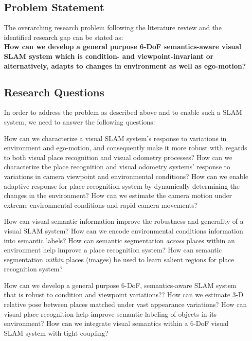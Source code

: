 \documentclass{article}
\begin{document}
\subsection{Problem Statement}

The overarching research problem following the literature review and the identified research gap can be stated as: \\
\textbf{How can we develop a general purpose 6-DoF semantics-aware visual SLAM system which is condition- and viewpoint-invariant or alternatively, adapts to changes in environment as well as ego-motion?}

\subsection{Research Questions}

In order to address the problem as described above and to enable such a SLAM system, we need to answer the following questions:
\begin{outline}
 \1 How can we characterize a visual SLAM system’s response to variations in environment and ego-motion, and consequently make it more robust with regards to both visual place recognition and visual odometry processes?
 \2 How can we characterize the place recognition and visual odometry systems' response to variations in camera viewpoint and environmental conditions?
 \2 How can we enable adaptive response for place recognition system by dynamically determining the changes in the environment?
 \2 How can we estimate the camera motion under extreme environmental conditions and rapid camera movements?
 
 \1 How can visual semantic information improve the robustness and generality of a visual SLAM system?
 \2 How can we encode environmental conditions information into semantic labels?
 \2 How can semantic segmentation \emph{across} places within an environment help improve a place recognition system?
 \2 How can semantic segmentation \emph{within} places (images) be used to learn salient regions for place recognition system?
 
 \1 How can we develop a general purpose 6-DoF, semantics-aware SLAM system that is robust to condition and viewpoint variations??
 \2 How can we estimate 3-D relative pose between places matched under vast appearance variations?
 \2 How can visual place recognition help improve semantic labeling of objects in its environment?
 \2 How can we integrate visual semantics within a 6-DoF visual SLAM system with tight coupling?
 
\end{outline}
\end{document}
